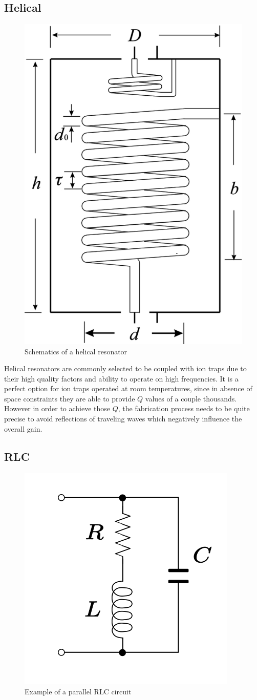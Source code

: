 \subsection{Helical}
\begin{figure}[h]
	\centering
	\includegraphics[width=.6\textwidth]{images/helical}
	\caption{Schematics of a helical resonator \cite{Deng2014}}
\end{figure}

Helical resonators are commonly selected to be coupled with ion traps due to their high quality factors and ability to operate on high frequencies. It is a perfect option for ion traps operated at room temperatures, since in absence of space constraints they are able to provide $Q$ values of a couple thousands. However in order to achieve those $Q$, the fabrication process needs to be quite precise to avoid reflections of traveling waves which negatively influence the overall gain.
\subsection{RLC}
\begin{figure}[h]
	\centering
	\includegraphics[width=.5\textwidth]{images/RLC}
	\caption{Example of a parallel RLC circuit}
\end{figure}

